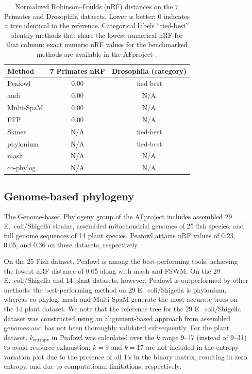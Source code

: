 \documentclass[11pt]{article}
\begin{document}
\begin{table}[t]
\centering
\caption{Normalized Robinson--Foulds (nRF) distances on the 7 Primates and Drosophila datasets. Lower is better; 0 indicates a tree identical to the reference. Categorical labels ``tied-best'' identify methods that share the lowest numerical nRF for that column; exact numeric nRF values for the benchmarked methods are available in the AFproject \cite{zielezinski2019afproject}.}
\label{tab:primates_drosophila}
\begin{tabular}{lcc}
\toprule
Method & 7 Primates nRF & Drosophila (category) \\
\midrule
Peafowl      & 0.00 & tied-best \\
andi         & 0.00 & N/A \\
Multi-SpaM   & 0.00 & N/A \\
FFP          & 0.00 & N/A \\
Skmer        & N/A  & tied-best \\
phylonium    & N/A  & tied-best \\
mash         & N/A  & N/A \\
co-phylog    & N/A  & N/A \\
\bottomrule
\end{tabular}
\end{table}

\subsection{Genome-based phylogeny}

The Genome-based Phylogeny group of the AFproject \cite{zielezinski2019afproject} includes assembled 29 E.~coli/Shigella strains, assembled mitochondrial genomes of 25 fish species, and full genome sequences of 14 plant species. Peafowl attains nRF values of 0.23, 0.05, and 0.36 on these datasets, respectively.

On the 25 Fish dataset, Peafowl is among the best-performing tools, achieving the lowest nRF distance of 0.05 along with mash and FSWM. On the 29 E.~coli/Shigella and 14 plant datasets, however, Peafowl is outperformed by other methods: the best-performing method on 29 E.~coli/Shigella is phylonium, whereas co-phylog, mash and Multi-SpaM generate the most accurate trees on the 14 plant dataset. We note that the reference tree for the 29 E.~coli/Shigella dataset was constructed using an alignment-based approach from assembled genomes \cite{yi2013cophylog} and has not been thoroughly validated subsequently. For the plant dataset, $k_{\text{entropy}}$ in Peafowl was calculated over the $k$ range 9--17 (instead of 9--31) to avoid resource exhaustion; $k=9$ and $k=17$ are not included in the entropy variation plot due to the presence of all 1's in the binary matrix, resulting in zero entropy, and due to computational limitations, respectively.
\end{document}
